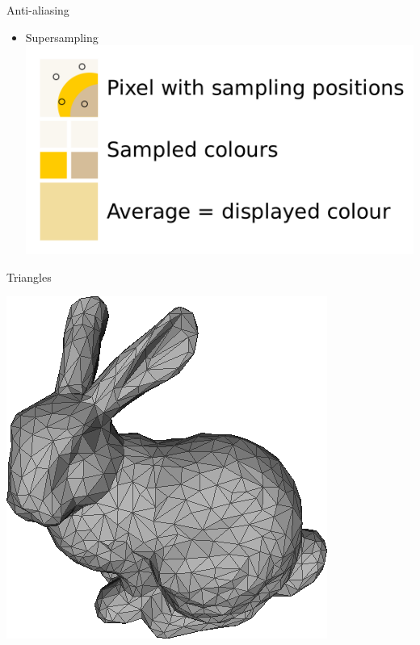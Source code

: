 \documentclass[xcolor=table]{beamer}
\begin{document}
\begin{frame}{Anti-aliasing}

\begin{itemize}
\item Supersampling
\includegraphics[scale=0.20]{media/Supersampling.png}
\end{itemize}

\end{frame}


\begin{frame}{Triangles}

	\includegraphics[scale=0.35]{media/snapshot00.png}

\end{frame}
\end{document}
